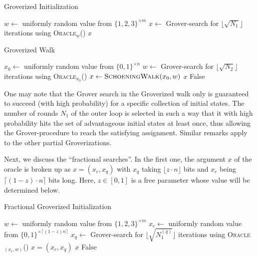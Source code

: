 \documentclass[a4paper,aps,floatfix]{revtex4}
\begin{document}
\begin{algorithm}[H]
	\caption{Groverized Initialization}\label{alg:gi}
	\begin{algorithmic}[1]
				\State $w\leftarrow$ uniformly random value from 
				$\{1, 2, 3\}^{\times m }$
				\State $x\leftarrow$ Grover-search for $\lfloor \sqrt{N_1}\rfloor$ iterations using \textsc{Oracle$_w$}()
					\State\Return $x$
				\EndIf
			\EndFor
	\end{algorithmic}
\end{algorithm}
 

\begin{algorithm}[H]
	\caption{Groverized Walk}\label{alg:gw}
	\begin{algorithmic}[1]
				\State $x_0\leftarrow$ uniformly random value from $\{0,1\}^{\times n}$
				\State $w\leftarrow$ Grover-search for $\lfloor \sqrt{N_2}\rfloor$ iterations using \textsc{Oracle$_{x_0}$}()
				\State $x\leftarrow \textsc{SchoeningWalk}(x_0,w)$ 
					\State\Return $x$
				\EndIf
			\EndFor
			\State \Return False
	\end{algorithmic}
\end{algorithm}

One may note that the Grover search in the Groverized walk only is guaranteed to succeed (with high probability) for a specific collection of initial states. The number of rounds $N_1$ of the outer loop is selected in such a way that it with high probability hits the set of advantageous initial states at least once, thus allowing the Grover-procedure to reach the satisfying assignment. Similar remarks apply to the other partial Groverizations.


Next, we discuss the ``fractional searches''. 
In the first one, the argument $x$ of the oracle is broken up as $x=(x_c, x_q)$ with $x_q$ taking $\lfloor z\cdot n \rfloor$ bits and $x_c$ being $\lceil (1-z)\cdot n \rceil$ bits long.
Here, $z\in[0,1]$ is a free parameter whose value will be determined below.

\begin{algorithm}[H]
	\caption{Fractional Groverized Initialization}\label{alg:fgi}
	\begin{algorithmic}[1]
				\State $w\leftarrow$ uniformly random value from $\{1, 2, 3\}^{\times m }$
				\State $x_c\leftarrow$ uniformly random value from $\{0,1\}^{\times \lceil(1-z)n\rceil}$
				\State $x_q\leftarrow$ Grover-search for $\Big\lfloor \sqrt{N_1^{(q)}}\Big\rfloor$ iterations using \textsc{Oracle$_{(x_c, w)}$}()
				\State $x=(x_c,x_q)$
						\State\Return $x$
					\EndIf
				\EndFor
			\EndFor
			\State \Return False
	\end{algorithmic}
\end{algorithm}
\end{document}
